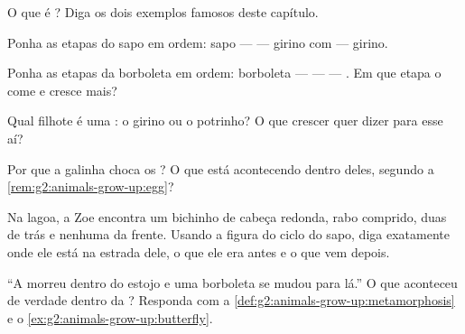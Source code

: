 \begin{exercise}[$\star$]\label{exo:g2:animals-grow-up:4}
O que é ? Diga os dois exemplos famosos deste capítulo.
\end{exercise}

\begin{exercise}[$\star$]\label{exo:g2:animals-grow-up:5}
Ponha as etapas do sapo em ordem: sapo ---  --- girino com
 --- girino.
\end{exercise}

\begin{exercise}[$\star$]\label{exo:g2:animals-grow-up:6}
Ponha as etapas da borboleta em ordem: borboleta ---  --- 
--- . Em que etapa o  come  e cresce mais?
\end{exercise}

\begin{exercise}[$\star$]\label{exo:g2:animals-grow-up:7}
Qual filhote é uma : o girino ou o potrinho? O que
crescer quer dizer para esse aí?
\end{exercise}

\begin{exercise}[$\star$]\label{exo:g2:animals-grow-up:8}
Por que a galinha choca os ? O que está acontecendo dentro
deles, segundo a \cref{rem:g2:animals-grow-up:egg}?
\end{exercise}

\begin{exercise}[$\star\star$]\label{exo:g2:animals-grow-up:9}
Na lagoa, a Zoe encontra um bichinho de cabeça redonda, rabo
comprido, duas  de trás e nenhuma  da frente. Usando a
figura do ciclo do sapo, diga exatamente onde ele está na estrada
dele, o que ele era antes e o que vem depois.
\end{exercise}

\begin{exercise}[$\star\star$]\label{exo:g2:animals-grow-up:10}
``A  morreu dentro do estojo e uma borboleta se mudou para
lá.'' O que aconteceu de verdade dentro da ? Responda com a
\cref{def:g2:animals-grow-up:metamorphosis} e o
\cref{ex:g2:animals-grow-up:butterfly}.
\end{exercise}
